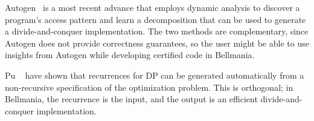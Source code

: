 Autogen~\cite{PPoPP16/Chowdhury} is a most recent advance that employs dynamic analysis to discover
a program's access pattern and learn a decomposition that can be used to generate a divide-and-conquer
implementation. The two methods are complementary, since Autogen does not provide correctness guarantees, so the user might be able to use insights from Autogen while developing certified code in Bellmania.

Pu \etal{}~\cite{OOPSLA11/Pu} have shown that recurrences for DP can be generated automatically from a non-recursive specification of the optimization problem.
This is orthogonal; in Bellmania, the recurrence is the input, and the output is an efficient divide-and-conquer implementation.

\begin{comment}
Our ``$\big/$'' operator can be compared to the separating disjunction ``$\ast$'' of Separation Logic~\cite{LICS02/Reynolds},
used to frame parts of the dynamic heap (which can be thought of as one large array),
in particular while checking that a program only accesses the parts allocated to it in its precondition.
While $\ast$ has the semantics of an existentially quantified predicate, Bellmania uses type qualifiers
to explicitly specify a formula defining each part. In this sense, it is more closely related to
Region Logic~\cite{ECOOP08/Banerjee}. These formulas make encoding in first-order logic straightforward,
and the use of Liquid Types allows for any number of dimensions and for decidable checking of domain inclusion
and disjointness.
\end{comment}